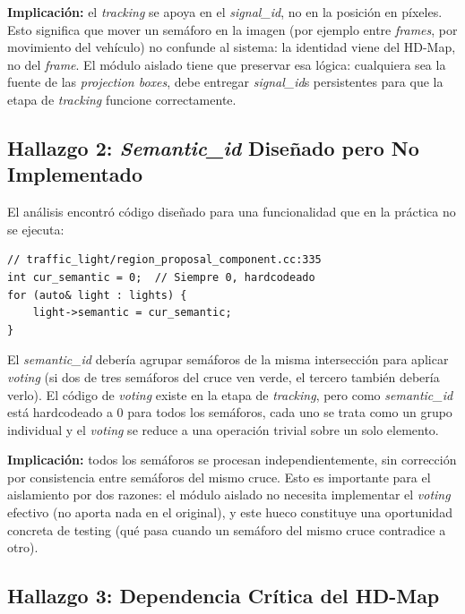 \textbf{Implicación:} el \textit{tracking} se apoya en el \textit{signal\_id}, no en la posición en píxeles. Esto significa que mover un semáforo en la imagen (por ejemplo entre \textit{frames}, por movimiento del vehículo) no confunde al sistema: la identidad viene del HD-Map, no del \textit{frame}. El módulo aislado tiene que preservar esa lógica: cualquiera sea la fuente de las \textit{projection boxes}, debe entregar \textit{signal\_id}s persistentes para que la etapa de \textit{tracking} funcione correctamente.

\subsection{Hallazgo 2: \textit{Semantic\_id} Diseñado pero No Implementado}

El análisis encontró código diseñado para una funcionalidad que en la práctica no se ejecuta:

\begin{codesnippet}
\begin{verbatim}
// traffic_light/region_proposal_component.cc:335
int cur_semantic = 0;  // Siempre 0, hardcodeado
for (auto& light : lights) {
    light->semantic = cur_semantic;
}
\end{verbatim}
\end{codesnippet}

El \textit{semantic\_id} debería agrupar semáforos de la misma intersección para aplicar \textit{voting} (si dos de tres semáforos del cruce ven verde, el tercero también debería verlo). El código de \textit{voting} existe en la etapa de \textit{tracking}, pero como \textit{semantic\_id} está hardcodeado a 0 para todos los semáforos, cada uno se trata como un grupo individual y el \textit{voting} se reduce a una operación trivial sobre un solo elemento.

\textbf{Implicación:} todos los semáforos se procesan independientemente, sin corrección por consistencia entre semáforos del mismo cruce. Esto es importante para el aislamiento por dos razones: el módulo aislado no necesita implementar el \textit{voting} efectivo (no aporta nada en el original), y este hueco constituye una oportunidad concreta de testing (qué pasa cuando un semáforo del mismo cruce contradice a otro).

\subsection{Hallazgo 3: Dependencia Crítica del HD-Map}

